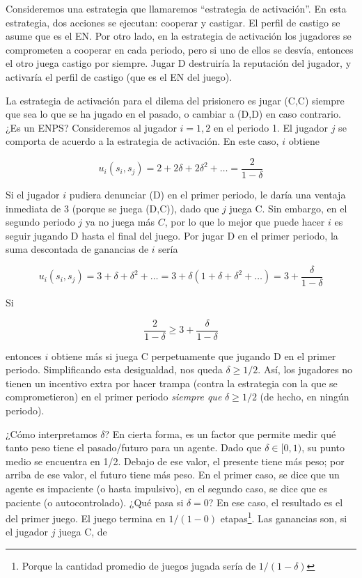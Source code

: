 \documentclass[12pt]{scrartcl}
\begin{document}
Consideremos una estrategia que llamaremos ``estrategia de activación''. En esta estrategia, dos acciones se ejecutan: cooperar y castigar. El perfil de castigo se asume que es el EN. Por otro lado, en la estrategia de activación los jugadores se comprometen a cooperar en cada periodo, pero si uno de ellos se desvía, entonces el otro juega castigo por siempre. Jugar D destruiría la reputación del jugador, y activaría el perfil de castigo (que es el EN del juego).

La estrategia de activación para el dilema del prisionero es jugar (C,C) siempre que sea lo que se ha jugado en el pasado, o cambiar a (D,D) en caso contrario. ¿Es un ENPS? Consideremos al jugador $i=1, 2$ en el periodo 1. El jugador $j$ se comporta de acuerdo a la estrategia de activación. En este caso, $i$ obtiene

$$u_i(s_i, s_j)=2 + 2\delta + 2\delta^2 + \dots = \frac{2}{1-\delta}$$

Si el jugador $i$ pudiera denunciar (D) en el primer periodo, le daría una ventaja inmediata de $3$ (porque se juega (D,C)), dado que $j$ juega C. Sin embargo, en el segundo periodo $j$ ya no juega más $C$, por lo que lo mejor que puede hacer $i$ es seguir jugando D hasta el final del juego. Por jugar D en el primer periodo, la suma descontada de ganancias de $i$ sería

$$u_i(s_i, s_j)=3 + \delta + \delta^2 + \dots = 3 + \delta(1 + \delta + \delta^2 + \dots) = 3 + \frac{\delta}{1-\delta}$$

Si

\[
\frac{2}{1-\delta} \geq 3 + \frac{\delta}{1-\delta}
\]

entonces $i$ obtiene más si juega C perpetuamente que jugando D en el primer periodo. Simplificando esta desigualdad, nos queda $\delta \geq 1/2$. Así, los jugadores no tienen un incentivo extra por hacer trampa (contra la estrategia con la que se comprometieron) en el primer periodo \textit{siempre que} $\delta \geq 1/2$ (de hecho, en ningún periodo). 

¿Cómo interpretamos $\delta$? En cierta forma, es un factor que permite medir qué tanto peso tiene el pasado/futuro para un agente. Dado que $\delta \in [0, 1)$, su punto medio se encuentra en 1/2. Debajo de ese valor, el presente tiene más peso; por arriba de ese valor, el futuro tiene más peso. En el primer caso, se dice que un agente es impaciente (o hasta impulsivo), en el segundo caso, se dice que es paciente (o autocontrolado). ¿Qué pasa si $\delta = 0$? En ese caso, el resultado es el del primer juego. El juego termina en $1/(1-0)$ etapas\footnote{Porque la cantidad promedio de juegos jugada sería de $1/(1-\delta)$}. Las ganancias son, si el jugador $j$ juega C, de
\end{document}
